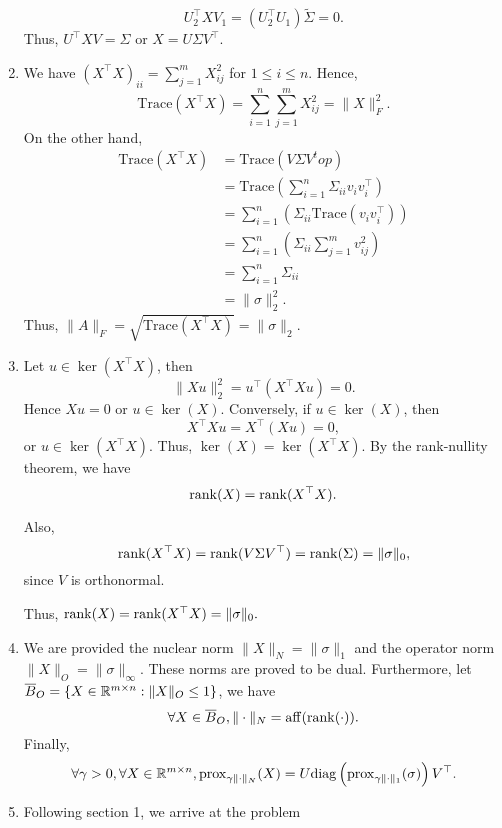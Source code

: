 \begin{enumerate}
        $$U_2^\top XV_1 = (U_2^\top U_1)\tilde{\Sigma} = 0.$$
        Thus, $U^\top XV = \Sigma$ or $X = U\Sigma V^\top$.
  \item We have $(X^\top X)_{ii} = \sum\limits_{j=1}^{m} X_{ij}^2$ for $1\le i \le n$. Hence,
        $$\mathrm{Trace}(X^\top X) = \sum\limits_{i=1}^n \sum\limits_{j=1}^{m} X_{ij}^2 = \|X\|_F^2.$$
        On the other hand,
        \begin{align*}
          \mathrm{Trace}(X^\top X)
           & = \mathrm{Trace}(V\Sigma V^top)                                            \\
           & = \mathrm{Trace}(\sum\limits_{i=1}^n \Sigma_{ii} v_iv_i^\top)              \\
           & = \sum\limits_{i=1}^n(\Sigma_{ii} \mathrm{Trace}(v_iv_i^\top))             \\
           & = \sum\limits_{i=1}^n\left(\Sigma_{ii} \sum\limits_{j=1}^m v_{ij}^2\right) \\
           & = \sum\limits_{i=1}^n\Sigma_{ii}                                           \\
           & = \|\sigma\|_2^2.
        \end{align*}
        Thus, $\|A\|_F = \sqrt{\mathrm{Trace}(X^\top X)} = \|\sigma\|_2$.
  \item Let $u\in\ker(X^\top X)$, then
        $$\|Xu\|_2^2 = u^\top (X^\top X u) = 0.$$
        Hence $Xu = 0$ or $u\in\ker(X)$. Conversely, if $u\in\ker(X)$, then
        $$X^\top Xu = X^\top (Xu) = 0,$$
        or $u\in\ker(X^\top X)$. Thus, $\ker(X) = \ker(X^\top X)$. By the rank-nullity theorem, we have $$\mathrm{rank}(X) = \mathrm{rank}(X^\top X).$$

        Also,
        $$\mathrm{rank}(X^\top X) = \mathrm{rank}(V\Sigma V^\top) = \mathrm{rank}(\Sigma) = \|\sigma\|_0,$$
        since $V$ is orthonormal.

        Thus, $\mathrm{rank}(X) = \mathrm{rank}(X^\top X) = \|\sigma\|_0.$

  \item We are provided the nuclear norm $\|X\|_N = \|\sigma\|_1$ and the operator norm $\|X\|_O = \|\sigma\|_{\infty}$. These norms are proved to be dual. Furthermore, let $\overline{B}_{O} = \{X\in{\mathbb{R}}^{m\times n} : \|X\|_O \le 1\}$, we have
        $$\forall X\in \overline{B}_{O}, \|\cdot\|_N = \mathrm{aff}(\mathrm{rank}(\cdot)).$$
        Finally,
        \begin{equation}
          \label{eq:prox-nuclear}
          \forall \gamma > 0,\forall X\in {\mathbb{R}}^{m\times n}, \mathrm{prox}_{\gamma\|\cdot\|_N}(X) = U\mathrm{diag}\left(\mathrm{prox}_{\gamma \|\cdot\|_1}(\sigma)\right)V^\top.
        \end{equation}
  \item Following section 1, we arrive at the problem


\end{enumerate}

